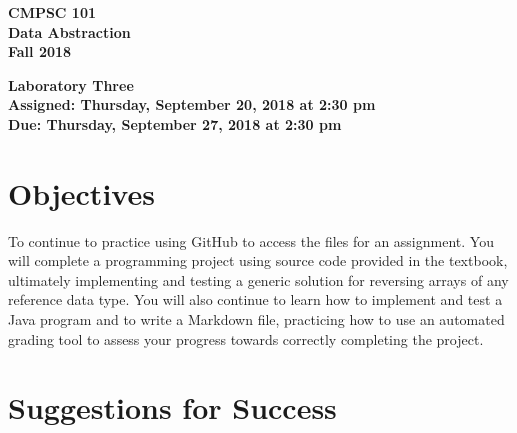 \documentclass[11pt]{article}
\newcommand{\assignmentduedate}{September 27}
\newcommand{\assignmentassignedate}{September 20}
\newcommand{\assignmentnumber}{Three}
\newcommand{\labyear}{2018}
\newcommand{\labday}{Thursday}
\newcommand{\labtime}{2:30 pm}
\newcommand{\assigneddate}{Assigned: \labday, \assignmentassignedate, \labyear{} at \labtime{}}
\newcommand{\duedate}{Due: \labday, \assignmentduedate, \labyear{} at \labtime{}}
\newcommand{\labtitle}[1]
{
  \begin{center}
    \begin{center}
      \bf
      CMPSC 101\\Data Abstraction\\
      Fall 2018\\
      \medskip
    \end{center}
    \bf
    #1
  \end{center}
}
\begin{document}
\thispagestyle{empty}

\labtitle{Laboratory \assignmentnumber{} \\ \assigneddate{} \\ \duedate{}}

\section*{Objectives}

To continue to practice using GitHub to access the files for an assignment. You
will complete a programming project using source code provided in the textbook,
ultimately implementing and testing a generic solution for reversing arrays of
any reference data type. You will also continue to learn how to implement and
test a Java program and to write a Markdown file, practicing how to use an
automated grading tool to assess your progress towards correctly completing the
project.

\section*{Suggestions for Success}
\end{document}
